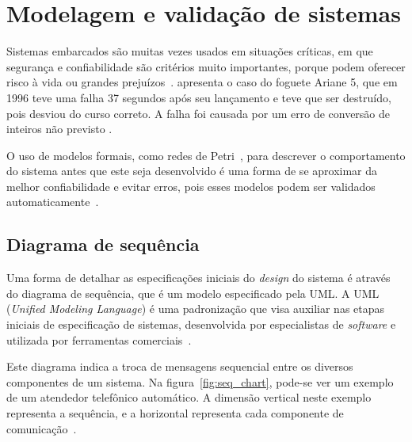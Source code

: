 
\section{Modelagem e validação de sistemas}\label{sec:modelosformais}

Sistemas embarcados são muitas vezes usados em situações críticas, em que segurança e confiabilidade são critérios muito importantes, porque podem oferecer risco à vida ou grandes prejuízos~\cite{edwards:1997}.  apresenta o caso do foguete Ariane 5, que em 1996 teve uma falha 37 segundos após seu lançamento e teve que ser destruído, pois desviou do curso correto. A falha foi causada por um erro de conversão de inteiros não previsto \cite{buttazzo2011:realtime}.

O uso de modelos formais, como redes de Petri~\cite{peterson:1981}, para descrever o comportamento do sistema antes que este seja desenvolvido é uma forma de se aproximar da melhor confiabilidade e evitar erros, pois esses modelos podem ser validados automaticamente~\cite{edwards:1997}.

\subsection{Diagrama de sequência}
Uma forma de detalhar as especificações iniciais do \textit{design} do sistema é através do diagrama de sequência, que é um modelo especificado pela UML. A UML (\textit{Unified Modeling Language}) é uma padronização que visa auxiliar nas etapas iniciais de especificação de sistemas, desenvolvida por especialistas de \textit{software} e utilizada por ferramentas comerciais~\cite{marwedel:2010}.

Este diagrama indica a troca de mensagens sequencial entre os diversos componentes de um sistema. Na figura~\ref{fig:seq_chart}, pode-se ver um exemplo de um atendedor telefônico automático. A dimensão vertical neste exemplo representa a sequência, e a horizontal representa cada componente de comunicação~\cite{marwedel:2010}.


